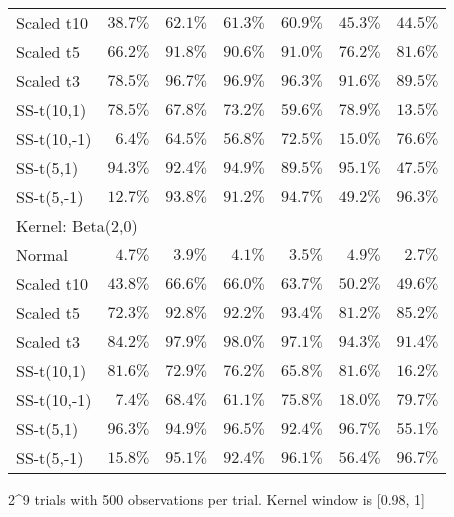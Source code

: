 \begin{longtable}{lrrrrrr}
Scaled t10 & $38.7\%$ & $62.1\%$ & $61.3\%$ & $60.9\%$ & $45.3\%$ & $44.5\%$ \\ 
Scaled t5 & $66.2\%$ & $91.8\%$ & $90.6\%$ & $91.0\%$ & $76.2\%$ & $81.6\%$ \\ 
Scaled t3 & $78.5\%$ & $96.7\%$ & $96.9\%$ & $96.3\%$ & $91.6\%$ & $89.5\%$ \\ 
SS-t(10,1) & $78.5\%$ & $67.8\%$ & $73.2\%$ & $59.6\%$ & $78.9\%$ & $13.5\%$ \\ 
SS-t(10,-1) & $6.4\%$ & $64.5\%$ & $56.8\%$ & $72.5\%$ & $15.0\%$ & $76.6\%$ \\ 
SS-t(5,1) & $94.3\%$ & $92.4\%$ & $94.9\%$ & $89.5\%$ & $95.1\%$ & $47.5\%$ \\ 
SS-t(5,-1) & $12.7\%$ & $93.8\%$ & $91.2\%$ & $94.7\%$ & $49.2\%$ & $96.3\%$ \\ 
\midrule
\multicolumn{7}{l}{Kernel: Beta(2,0)} \\ 
\midrule
Normal & $4.7\%$ & $3.9\%$ & $4.1\%$ & $3.5\%$ & $4.9\%$ & $2.7\%$ \\ 
Scaled t10 & $43.8\%$ & $66.6\%$ & $66.0\%$ & $63.7\%$ & $50.2\%$ & $49.6\%$ \\ 
Scaled t5 & $72.3\%$ & $92.8\%$ & $92.2\%$ & $93.4\%$ & $81.2\%$ & $85.2\%$ \\ 
Scaled t3 & $84.2\%$ & $97.9\%$ & $98.0\%$ & $97.1\%$ & $94.3\%$ & $91.4\%$ \\ 
SS-t(10,1) & $81.6\%$ & $72.9\%$ & $76.2\%$ & $65.8\%$ & $81.6\%$ & $16.2\%$ \\ 
SS-t(10,-1) & $7.4\%$ & $68.4\%$ & $61.1\%$ & $75.8\%$ & $18.0\%$ & $79.7\%$ \\ 
SS-t(5,1) & $96.3\%$ & $94.9\%$ & $96.5\%$ & $92.4\%$ & $96.7\%$ & $55.1\%$ \\ 
SS-t(5,-1) & $15.8\%$ & $95.1\%$ & $92.4\%$ & $96.1\%$ & $56.4\%$ & $96.7\%$ \\ 
\bottomrule
\end{longtable}
\begin{minipage}{\linewidth}
2\textasciicircum{}9 trials with 500 observations per trial. Kernel window is [0.98, 1]\\
\end{minipage}

